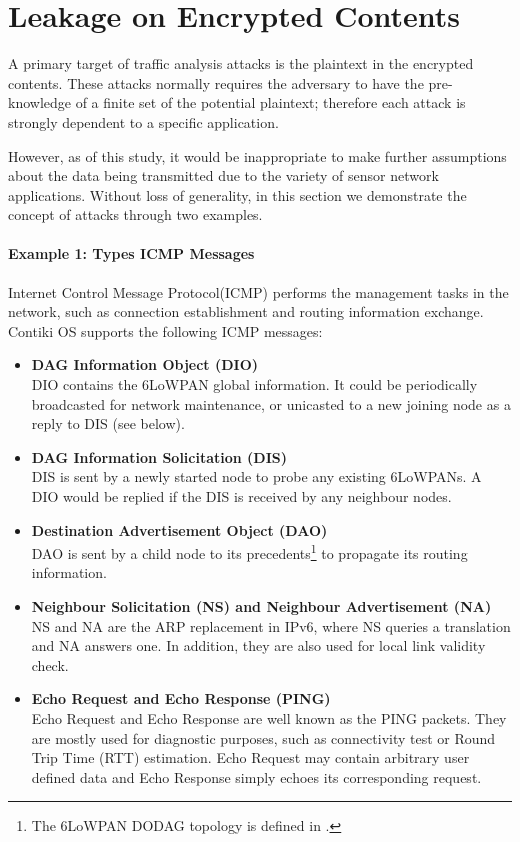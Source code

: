 \section{Leakage on Encrypted Contents}

A primary target of traffic analysis attacks is the plaintext in the encrypted contents. These attacks normally requires the adversary to have the pre-knowledge of a finite set of the potential plaintext; therefore each attack is strongly dependent to a specific application.

However, as of this study, it would be inappropriate to make further assumptions about the data being transmitted due to the variety of sensor network applications. Without loss of generality, in this section we demonstrate the concept of attacks through two examples.

\paragraph{Example 1: Types ICMP Messages}

Internet Control Message Protocol(ICMP)\cite{rfc4443} performs the management tasks in the network, such as connection establishment and routing information exchange. Contiki OS supports the following ICMP messages:

\begin{itemize}
	\item \textbf{DAG Information Object (DIO)} \\
	DIO contains the 6LoWPAN global information. It could be periodically broadcasted for network maintenance, or unicasted to a new joining node as a reply to DIS (see below).
	\item \textbf{DAG Information Solicitation (DIS)} \\
	DIS is sent by a newly started node to probe any existing 6LoWPANs. A DIO would be replied if the DIS is received by any neighbour nodes.
	\item \textbf{Destination Advertisement Object (DAO)} \\
	DAO is sent by a child node to its precedents\footnote{The 6LoWPAN DODAG topology is defined in \cite{rfc6550}.} to propagate its routing information.
	\item \textbf{Neighbour Solicitation (NS) and Neighbour Advertisement (NA)} \\
	NS and NA are the ARP replacement in IPv6, where NS queries a translation and NA answers one. In addition, they are also used for local link validity check.
	\item \textbf{Echo Request and Echo Response (PING)} \\
	Echo Request and Echo Response are well known as the PING packets. They are mostly used for diagnostic purposes, such as connectivity test or Round Trip Time (RTT) estimation. Echo Request may contain arbitrary user defined data and Echo Response simply echoes its corresponding request.
\end{itemize}

